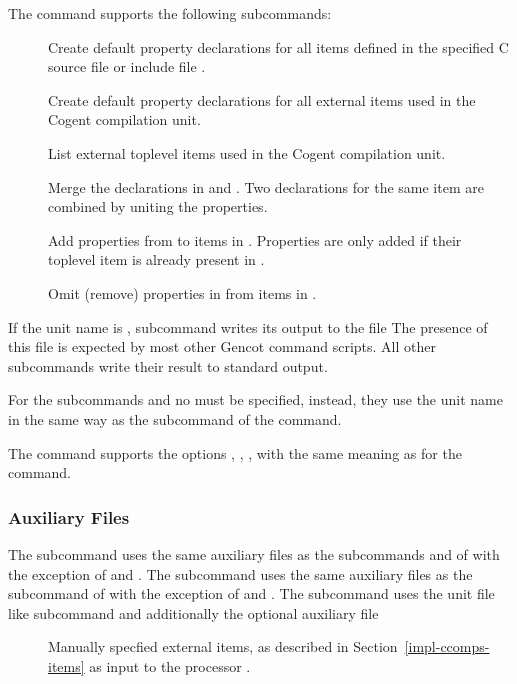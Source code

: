 The  command supports the following subcommands:
\begin{description}
\item[] Create default property declarations for all items defined in the specified C source file
or include file . 

\item[] Create default property declarations for all external items used in the Cogent compilation 
unit. 

\item[] List external toplevel items used in the Cogent compilation unit. 

\item[] Merge the declarations in  and . Two declarations for the 
same item are combined by uniting the properties.

\item[] Add properties from  to items in . Properties are only added
if their toplevel item is already present in .

\item[] Omit (remove) properties in  from items in . 

\end{description}

If the unit name is , subcommand  writes its output to the file 
The presence of this file is expected by most other Gencot command scripts. All other subcommands write their result to 
standard output.

For the subcommands  and  no  must be specified, instead, they use the unit name
in the same way as the subcommand  of the  command.

The  command supports the options , , ,  with the same meaning as
for the  command.

\subsubsection{Auxiliary Files}

The subcommand  uses the same auxiliary files as the subcommands  and  of  with
the exception of  and .
The subcommand  uses the same auxiliary files as the subcommand  of  with the exception
of  and .
The subcommand  uses the unit file  like subcommand  and additionally
the optional auxiliary file 
\begin{description}
\item[] Manually specfied external items, as described in Section~\ref{impl-ccomps-items} as
input to the processor .
\end{description}

